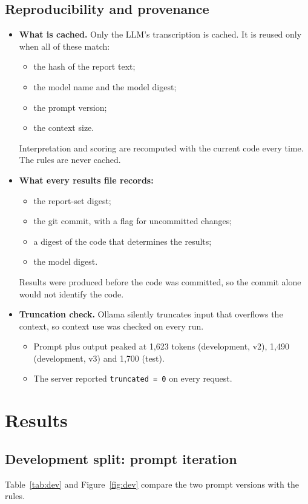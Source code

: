 \documentclass[11pt,a4paper]{article}
\begin{document}
\subsection{Reproducibility and provenance}
\begin{itemize}
  \item \textbf{What is cached.} Only the LLM's transcription is cached. It is reused only when all of these match:
  \begin{itemize}[nosep]
    \item the hash of the report text;
    \item the model name and the model digest;
    \item the prompt version;
    \item the context size.
  \end{itemize}
  Interpretation and scoring are recomputed with the current code every time. The rules are never cached.
  \item \textbf{What every results file records:}
  \begin{itemize}[nosep]
    \item the report-set digest;
    \item the git commit, with a flag for uncommitted changes;
    \item a digest of the code that determines the results;
    \item the model digest.
  \end{itemize}
  Results were produced before the code was committed, so the commit alone would not identify the code.
  \item \textbf{Truncation check.} Ollama silently truncates input that overflows the context, so context use was checked on every run.
  \begin{itemize}[nosep]
    \item Prompt plus output peaked at 1,623 tokens (development, v2), 1,490 (development, v3) and 1,700 (test).
    \item The server reported \texttt{truncated = 0} on every request.
  \end{itemize}
\end{itemize}

\section{Results}

\subsection{Development split: prompt iteration}
Table~\ref{tab:dev} and Figure~\ref{fig:dev} compare the two prompt versions with the rules.
\end{document}
